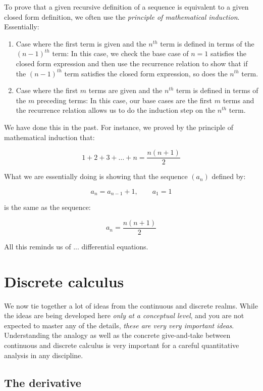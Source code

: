 \documentclass{amsart}
\begin{document}
To prove that a given recursive definition of a sequence is equivalent
to a given closed form definition, we often use the {\em principle of
mathematical induction}. Essentially:

\begin{enumerate}
\item Case where the first term is given and the $n^{th}$ term is
  defined in terms of the $(n-1)^{th}$ term: In this case, we check
  the base case of $n = 1$ satisfies the closed form expression and
  then use the recurrence relation to show that if the $(n-1)^{th}$
  term satisfies the closed form expression, so does the $n^{th}$ term.
\item Case where the first $m$ terms are given and the $n^{th}$ term
  is defined in terms of the $m$ preceding terms: In this case, our
  base cases are the first $m$ terms and the recurrence relation
  allows us to do the induction step on the $n^{th}$ term.
\end{enumerate}

We have done this in the past. For instance, we proved by the
principle of mathematical induction that:

$$1 + 2 + 3 + \dots + n = \frac{n(n+1)}{2}$$

What we are essentially doing is showing that the sequence $(a_n)$ defined by:

$$a_n = a_{n-1} + 1, \qquad a_1 = 1$$

is the same as the sequence:

$$a_n = \frac{n(n+1)}{2}$$

All this reminds us of ... differential equations.

\section{Discrete calculus}

We now tie together a lot of ideas from the continuous and discrete
realms. While the ideas are being developed here {\em only at a
conceptual level}, and you are not expected to master any of the
details, {\em these are very very important ideas}. Understanding the
analogy as well as the concrete give-and-take between continuous and
discrete calculus is very important for a careful quantitative
analysis in any discipline.

\subsection{The derivative}
\end{document}
